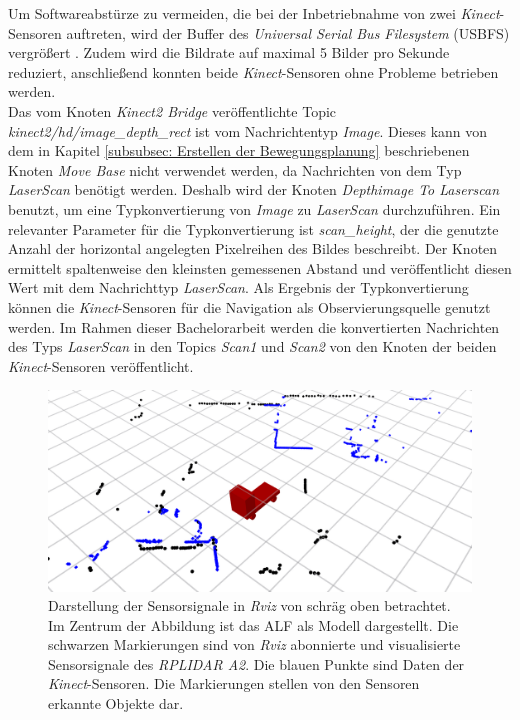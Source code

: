 		    	Um Softwareabstürze zu vermeiden, die bei der Inbetriebnahme von zwei \textit{Kinect}-Sensoren auftreten, wird der Buffer des \textit{Universal Serial Bus Filesystem} (USBFS) vergrößert \cite{libfreenect2troubleshooting}.
		    	Zudem wird die Bildrate auf maximal 5 Bilder pro Sekunde reduziert, anschließend konnten beide \textit{Kinect}-Sensoren ohne Probleme betrieben werden. \cite{iaikinect}\\
		   		    
		    	Das vom Knoten \textit{Kinect2 Bridge} veröffentlichte Topic \textit{kinect2/hd/image\_depth\_rect} ist vom Nachrichtentyp \textit{Image}. Dieses kann von dem in Kapitel \ref{subsubsec: Erstellen der Bewegungsplanung} beschriebenen Knoten \textit{Move Base} nicht verwendet werden, da Nachrichten von dem Typ \textit{LaserScan} benötigt werden.
			    Deshalb wird der Knoten \textit{Depthimage To Laserscan} benutzt, um eine Typkonvertierung von \textit{Image} zu \textit{LaserScan} durchzuführen.
		    	Ein relevanter Parameter für die Typkonvertierung ist \textit{scan\_height}, der die genutzte Anzahl der horizontal angelegten Pixelreihen des Bildes beschreibt. Der Knoten ermittelt spaltenweise den kleinsten gemessenen Abstand und veröffentlicht diesen Wert mit dem Nachrichttyp \textit{LaserScan}.
		    	Als Ergebnis der Typkonvertierung können die \textit{Kinect}-Sensoren für die Navigation als Observierungsquelle genutzt werden.
		    	Im Rahmen dieser Bachelorarbeit werden die konvertierten Nachrichten des Typs \textit{LaserScan} in den Topics \textit{Scan1} und \textit{Scan2} von den Knoten der beiden \textit{Kinect}-Sensoren veröffentlicht. \cite{depthimagetolaserscan}
		    	
		   
		     	\begin{figure}[H]
		     		\centering
		     		\includegraphics[width=1.0\textwidth]{Bilder/lidarundkinect.png}
		     		\caption{Darstellung der Sensorsignale in \textit{Rviz} von schräg oben betrachtet. Im Zentrum der Abbildung ist das ALF als Modell dargestellt. Die schwarzen Markierungen sind von \textit{Rviz} abonnierte und visualisierte Sensorsignale des \textit{RPLIDAR A2}. Die blauen Punkte sind Daten der \textit{Kinect}-Sensoren. Die Markierungen stellen von den Sensoren erkannte Objekte dar.}
		     		\label{fig: Laserscans in Rviz}
		     	\end{figure}
		     	
